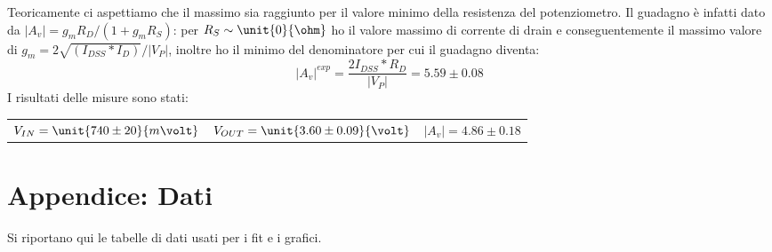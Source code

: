 \documentclass[10pt,a4paper]{article}
\begin{document}
Teoricamente ci aspettiamo che il massimo sia raggiunto per il valore minimo della resistenza del potenziometro.
Il guadagno è infatti dato da $|A_v| =g_mR_D/(1+g_mR_S)$: per $R_S\sim\unit{0}{\ohm}$ ho il valore massimo di corrente di drain e conseguentemente il massimo valore di $g_m = 2 \sqrt{(I_{DSS}*I_D)}/|V_P|$, inoltre ho il minimo del denominatore per cui il guadagno diventa:
\begin{equation*}
|A_v|^{exp} = \frac{2 I_{DSS}*R_D}{|V_P|} = 5.59 \pm 0.08 
\end{equation*}
I risultati delle misure sono stati:
\begin{table}[h!]
	\centering
	\begin{tabular}{ccc}
		$V_{IN}=\unit{740 \pm 20}{m\volt}$ & $V_{OUT} = \unit{3.60 \pm 0.09}{\volt}$ & $|A_v| = 4.86 \pm 0.18$\\
	\end{tabular}
\end{table}

\pagebreak
\section{Appendice: Dati}
Si riportano qui le tabelle di dati usati per i fit e i grafici.

\centering
\begin{figure}[h!]
	\begin{minipage}[t]{0.33\textwidth}
		\centering
		\resizebox{1\textwidth}{!}{
		}
		\label{njfet}
	\end{minipage}
	\begin{minipage}[t]{0.33\textwidth}
		\resizebox{1\textwidth}{!}{
		}
		\label{tab:commonsource}
	\end{minipage}
	\begin{minipage}[t]{0.32\textwidth}
		\centering
		\resizebox{1\textwidth}{!}{
		}
		\label{tab:sourcefollower}
	\end{minipage}
\end{figure}
\end{document}
